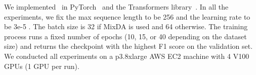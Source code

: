 We implemented \system\ in PyTorch~\cite{paszke2019pytorch} and 
the Transformers library~\cite{wolf2019transformers}.
In all the experiments, we fix the max sequence length to be 256 and the learning rate to be 3e-5 
.
The batch size is 32 if MixDA is used and 64 otherwise.
The training process runs a fixed number of epochs 
(10, 15, or 40 depending on the dataset size) and returns
the checkpoint with the highest F1 score on the validation set.
We conducted all experiments on a \textsf{p3.8xlarge} AWS EC2 machine 
with 4 V100 GPUs (1 GPU per run). 

